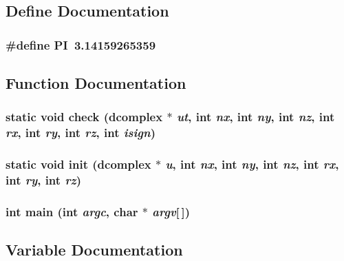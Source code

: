 \subsection{Define Documentation}
\subsubsection{\setlength{\rightskip}{0pt plus 5cm}\#define PI~3.14159265359}\label{testfft_8c_598a3330b3c21701223ee0ca14316eca}




\subsection{Function Documentation}
\subsubsection{\setlength{\rightskip}{0pt plus 5cm}static void check ({\bf dcomplex} $\ast$ {\em ut}, int {\em nx}, int {\em ny}, int {\em nz}, int {\em rx}, int {\em ry}, int {\em rz}, int {\em isign})\hspace{0.3cm}{\tt  [static]}}\label{testfft_8c_60cc44fb7c9a2b046168a423ba645394}


\subsubsection{\setlength{\rightskip}{0pt plus 5cm}static void init ({\bf dcomplex} $\ast$ {\em u}, int {\em nx}, int {\em ny}, int {\em nz}, int {\em rx}, int {\em ry}, int {\em rz})\hspace{0.3cm}{\tt  [static]}}\label{testfft_8c_ff3f79f9cd748c0e6b7878394b2661b1}


\subsubsection{\setlength{\rightskip}{0pt plus 5cm}int main (int {\em argc}, char $\ast$ {\em argv}[$\,$])}\label{testfft_8c_0ddf1224851353fc92bfbff6f499fa97}




\subsection{Variable Documentation}
